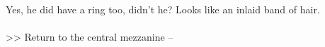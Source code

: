 Yes, he did have a ring too, didn’t he? Looks like an inlaid band of hair.\\
\\

>> Return to the central mezzanine -- 